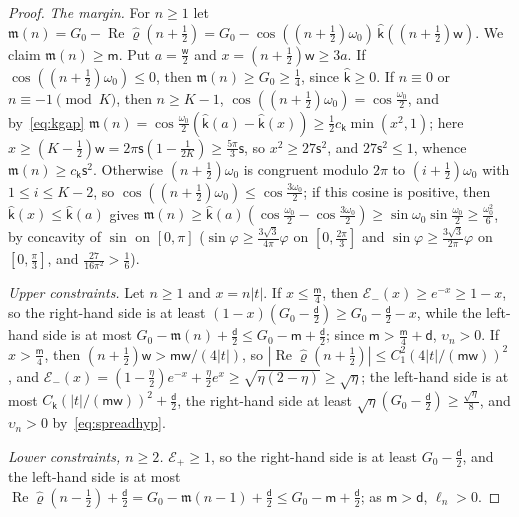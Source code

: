 \documentclass[11pt]{article}
\theoremstyle{definition}
\theoremstyle{remark}
\newcommand{\Rea}{\operatorname{Re}}
\begin{document}
\begin{proof}
\emph{The margin.}  For \(n\ge1\) let \(\mathfrak m(n)=G_0-\Rea\hat\varrho(n+\frac12)=G_0-\cos((n+\frac12)\omega_0)\,\hat{\mathsf k}((n+\frac12)\mathsf w)\).
We claim \(\mathfrak m(n)\ge\mathsf m\).  Put \(a=\frac{\mathsf w}2\) and \(x=(n+\frac12)\mathsf w\ge3a\).  If
\(\cos((n+\frac12)\omega_0)\le0\), then \(\mathfrak m(n)\ge G_0\ge\frac14\), since \(\hat{\mathsf k}\ge0\).  If \(n\equiv0\) or
\(n\equiv-1\pmod K\), then \(n\ge K-1\), \(\cos((n+\frac12)\omega_0)=\cos\frac{\omega_0}2\), and by~\eqref{eq:kgap}
\(\mathfrak m(n)=\cos\frac{\omega_0}2(\hat{\mathsf k}(a)-\hat{\mathsf k}(x))\ge\frac12c_{\mathsf k}\min(x^2,1)\); here
\(x\ge(K-\frac12)\mathsf w=2\pi\mathsf s(1-\frac1{2K})\ge\frac{5\pi}3\mathsf s\), so \(x^2\ge27\mathsf s^2\), and \(27\mathsf s^2\le1\), whence
\(\mathfrak m(n)\ge c_{\mathsf k}\mathsf s^2\).  Otherwise \((n+\frac12)\omega_0\) is congruent modulo \(2\pi\) to
\((i+\frac12)\omega_0\) with \(1\le i\le K-2\), so \(\cos((n+\frac12)\omega_0)\le\cos\frac{3\omega_0}2\); if this cosine is
positive, then \(\hat{\mathsf k}(x)\le\hat{\mathsf k}(a)\) gives
\(\mathfrak m(n)\ge\hat{\mathsf k}(a)(\cos\frac{\omega_0}2-\cos\frac{3\omega_0}2)\ge\sin\omega_0\sin\frac{\omega_0}2\ge\frac{\omega_0^2}6\), by concavity of
\(\sin\) on \([0,\pi]\) (\(\sin\varphi\ge\frac{3\sqrt3}{4\pi}\varphi\) on \([0,\frac{2\pi}3]\) and \(\sin\varphi\ge\frac{3\sqrt3}{2\pi}\varphi\) on \([0,\frac\pi3]\), and
\(\frac{27}{16\pi^2}>\frac16\)).

\emph{Upper constraints.}  Let \(n\ge1\) and \(x=n|t|\).  If \(x\le\frac{\mathsf m}4\), then \(\mathcal E_-(x)\ge e^{-x}\ge1-x\), so
the right-hand side is at least \((1-x)(G_0-\frac{\mathsf d}2)\ge G_0-\frac{\mathsf d}2-x\), while the left-hand side is
at most \(G_0-\mathfrak m(n)+\frac{\mathsf d}2\le G_0-\mathsf m+\frac{\mathsf d}2\); since \(\mathsf m>\frac{\mathsf m}4+\mathsf d\), \(\upsilon_n>0\).  If
\(x>\frac{\mathsf m}4\), then \((n+\frac12)\mathsf w>\mathsf m \mathsf w/(4|t|)\), so \(|\Rea\hat\varrho(n+\frac12)|\le C_1^2(4|t|/(\mathsf m \mathsf w))^2\), and
\(\mathcal E_-(x)=(1-\frac\eta2)e^{-x}+\frac\eta2e^x\ge\sqrt{\eta(2-\eta)}\ge\sqrt\eta\); the left-hand side is at most
\(C_{\mathsf k}(|t|/(\mathsf m \mathsf w))^2+\frac{\mathsf d}2\), the right-hand side at least \(\sqrt\eta(G_0-\frac{\mathsf d}2)\ge\frac{\sqrt\eta}8\), and
\(\upsilon_n>0\) by~\eqref{eq:spreadhyp}.

\emph{Lower constraints, \(n\ge2\).}  \(\mathcal E_+\ge1\), so the right-hand side is at least \(G_0-\frac{\mathsf d}2\), and
the left-hand side is at most \(\Rea\hat\varrho(n-\frac12)+\frac{\mathsf d}2=G_0-\mathfrak m(n-1)+\frac{\mathsf d}2\le G_0-\mathsf m+\frac{\mathsf d}2\); as
\(\mathsf m>\mathsf d\), \(\ell_n>0\).


\end{proof}
\end{document}
